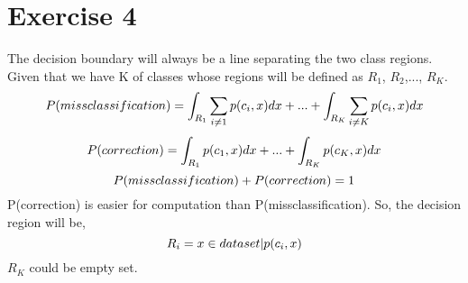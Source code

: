 \documentclass{article}
\numberwithin{equation}{section}
\begin{document}
\section{Exercise 4 }
The decision boundary will always be a line separating the two class regions. Given that we have K of classes whose regions will be defined as $R_1$, $R_2$,..., $R_K$.
\begin{equation}\label{eq15}
P(missclassification) = \int_{R_1} \sum_{i\neq1} p(c_i, x)dx + ... + \int_{R_K} \sum_{i\neq K} p(c_i, x)dx\\
\end{equation}
\begin{equation}\label{eq16}
P(correction) = \int_{R_1} p(c_1, x)dx + ... + \int_{R_K} p(c_K, x)dx\\
\end{equation}
\begin{equation}\label{eq17}
P(missclassification) + P(correction) = 1 \\
\end{equation}
P(correction) is easier for computation than P(missclassification). So, the decision region will be,\\
\begin{equation}\label{eq18}
R_i = {x \in dataset|p(c_i, x)} \\
\end{equation}
$R_K$ could be empty set. 
\end{document}

